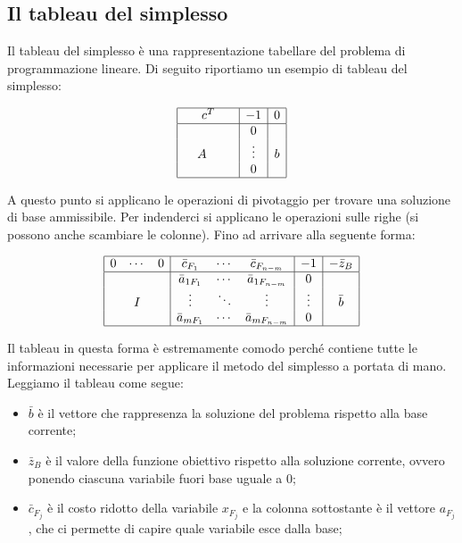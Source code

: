 \documentclass[12pt]{article}
\begin{document}
\subsection{Il tableau del simplesso}

Il tableau del simplesso è una rappresentazione tabellare del problema di
programmazione lineare. Di seguito riportiamo un esempio di tableau del
simplesso:

\[
	\begin{array}{|ccccc|c|c|}
		\hline
		\multicolumn{5}{|c|}{c^T}                 & -1     & 0             \\
		\hline
		                                          &        &   &  &  & 0 & \\
		\multicolumn{5}{|c|}{\quad A \quad \quad} & \vdots & b             \\
		                                          &        &   &  &  & 0 & \\
		\hline
	\end{array}
\]

A questo punto si applicano le operazioni di pivotaggio per trovare una
soluzione di base ammissibile. Per indenderci si applicano le operazioni sulle
righe (si possono anche scambiare le colonne). Fino ad arrivare alla seguente
forma:

\[
	\begin{array}{|ccc|ccc|c|c|}
		\hline
		0 & \cdots & 0 & \bar{c}_{F_1}  & \cdots & \bar{c}_{F_{n-m}}  & -1     & -\bar{z}_B \\
		\hline
		  &        &   & \bar{a}_{1F_1} & \cdots & \bar{a}_{1F_{n-m}} & 0      &            \\
		  & I      &   & \vdots         & \ddots & \vdots             & \vdots & \bar{b}    \\
		  &        &   & \bar{a}_{mF_1} & \cdots & \bar{a}_{mF_{n-m}} & 0      &            \\
		\hline
	\end{array}
\]

Il tableau in questa forma è estremamente comodo perché contiene tutte le
informazioni necessarie per applicare il metodo del simplesso a portata di mano.
Leggiamo il tableau come segue:
\begin{itemize}
	\item $\bar{b}$ è il vettore che rappresenza la soluzione del problema
	      rispetto alla base corrente;

	\item $\bar{z}_B$ è il valore della funzione obiettivo rispetto alla
	      soluzione corrente, ovvero ponendo ciascuna variabile fuori base
	      uguale a $0$;

	\item $\bar{c}_{F_j}$ è il costo ridotto della variabile $x_{F_j}$ e la
	      colonna sottostante è il vettore $a_{F_j}$, che ci permette di capire
	      quale variabile esce dalla base;
\end{itemize}
\end{document}
